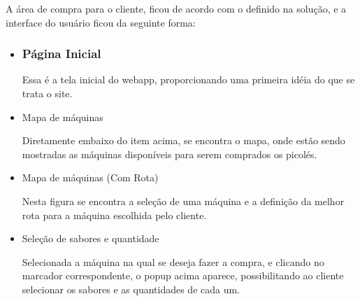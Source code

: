 A área de compra para o cliente, ficou de acordo com o definido na solução, e a interface do usuário ficou da seguinte forma:

\begin{itemize}
\item 

\subsubsection{Página Inicial}


Essa é a tela inicial do webapp, proporcionando uma primeira idéia do que se trata o site.

\item{Mapa de máquinas}


Diretamente embaixo do item acima, se encontra o mapa, onde estão sendo mostradas as máquinas disponíveis para serem comprados os picolés.

\item{Mapa de máquinas (Com Rota)}


Nesta figura se encontra a seleção de uma máquina e a definição da melhor rota para a máquina escolhida pelo cliente.


\item{Seleção de sabores e quantidade}


Selecionada a máquina na qual se deseja fazer a compra, e clicando no marcador correspondente, o popup acima aparece, possibilitando ao cliente selecionar os sabores e as quantidades de cada um.



\end{itemize}
